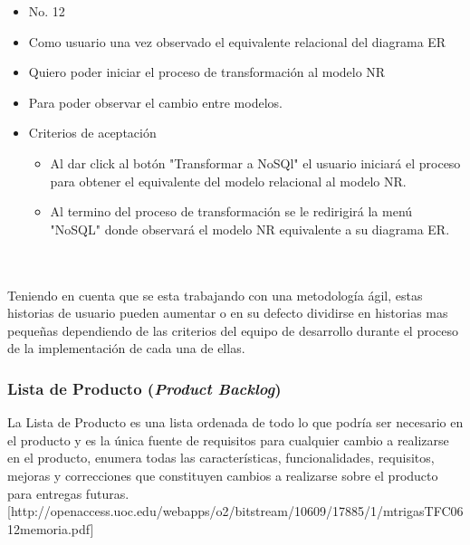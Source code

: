 \begin{itemize}
	\item No. 12
	\item Como usuario una vez observado el equivalente relacional del diagrama ER
	\item Quiero poder iniciar el proceso de transformación al modelo NR
	\item Para poder observar el cambio entre modelos.
	\item Criterios de aceptación
	\begin{itemize}
		\item Al dar click al botón "Transformar a NoSQl" el usuario iniciará el proceso para obtener el equivalente del modelo relacional al modelo NR.
		\item Al termino del proceso de transformación se le redirigirá la menú "NoSQL" donde observará el modelo NR equivalente a su diagrama ER.
	\end{itemize}
\end{itemize}

\\\\
Teniendo en cuenta que se esta trabajando con una metodología ágil, estas historias de usuario pueden aumentar o en su defecto dividirse en historias mas pequeñas dependiendo
de las criterios del equipo de desarrollo durante el proceso de la implementación de cada una de ellas.


\subsubsection{Lista de Producto (\textit{Product Backlog})}
La Lista de Producto es una lista ordenada de todo lo que podría ser necesario en el producto y es la única fuente de requisitos para cualquier cambio a realizarse en el producto, enumera todas las características, funcionalidades, requisitos, mejoras y correcciones que constituyen cambios a realizarse sobre el producto para entregas futuras.[http://openaccess.uoc.edu/webapps/o2/bitstream/10609/17885/1/mtrigasTFC0612memoria.pdf]

